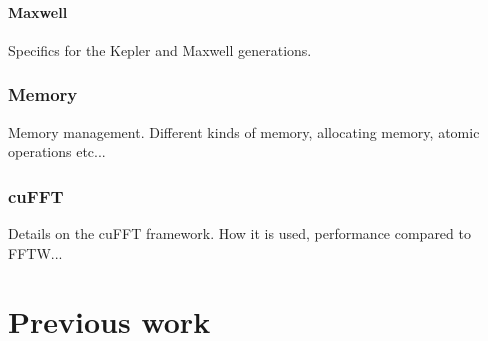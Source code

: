 \paragraph{Maxwell}
Specifics for the Kepler and Maxwell generations.

\subsubsection{Memory}
Memory management. Different kinds of memory, allocating memory, atomic
operations etc...

\subsubsection{cuFFT}
Details on the cuFFT framework. How it is used, performance compared to FFTW...


\section{Previous work}